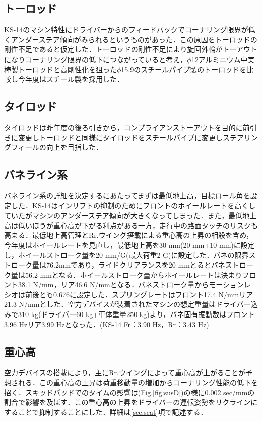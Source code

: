 \subsection{トーロッド}
KS-14のマシン特性にドライバーからのフィードバックでコーナリング限界が低くアンダーステア傾向がみられるというものがあった．この原因をトーロッドの剛性不足であると仮定した．トーロッドの剛性不足により旋回外輪がトーアウトになりコーナリング限界の低下につながっていると考え，$\phi$12アルミニウム中実棒製トーロッドと高剛性化を狙った$\phi$15.9のスチールパイプ製のトーロッドを比較し今年度はスチール製を採用した．

\subsection{タイロッド}
タイロッドは昨年度の後ろ引きから，コンプライアンストーアウトを目的に前引きに変更しトーロッドと同様にタイロッドをスチールパイプに変更しステアリングフィールの向上を目指した．

\subsection{バネライン系}
バネライン系の詳細を決定するにあたってまずは最低地上高，目標ロール角を設定した．KS-14はインリフトの抑制のためにフロントのホイールレートを高くしていたがマシンのアンダーステア傾向が大きくなってしまった．また，最低地上高は低いほうが重心高が下がる利点がある一方，走行中の路面タッチのリスクも高まる．最低地上高管理とRr.ウイング搭載による重心高の上昇の相殺を含め，今年度はホイールレートを見直し，最低地上高を30 mm(20 mm+10 mm)に設定し，ホイールストローク量を20 mm/G(最大荷重2 G)に設定した．バネの限界ストローク量は76.2mmであり，ライドクリアランスを20 mmとるとバネストローク量は56.2 mmとなる．ホイールストローク量からホイールレートは決まりフロント38.1 N/mm，リア46.6 N/mmとなる．バネストローク量からモーションレシオは前後とも0.676に設定した．スプリングレートはフロント17.4 N/mmリア21.3 N/mmとした．空力デバイスが装着されたマシンの想定重量はドライバー込みで310 kg(ドライバー60 kg+車体重量250 kg)より，バネ固有振動数はフロント3.96 Hzリア3.99 Hzとなった．(KS-14 Fr：3.90 Hz，Rr：3.43 Hz)

\subsection{重心高}
空力デバイスの搭載により，主にRr.ウイングによって重心高が上がることが予想される．この重心高の上昇は荷重移動量の増加からコーナリング性能の低下を招く．スキッドパッドでのタイムの影響は(Fig.\ref{fig:susD})の様に0.002 sec/mmの割合で影響を及ぼす．この重心高の上昇をドライバーの運転姿勢をリクラインにすることで抑制することにした．詳細は\ref{sec:seat}項で記述する．
